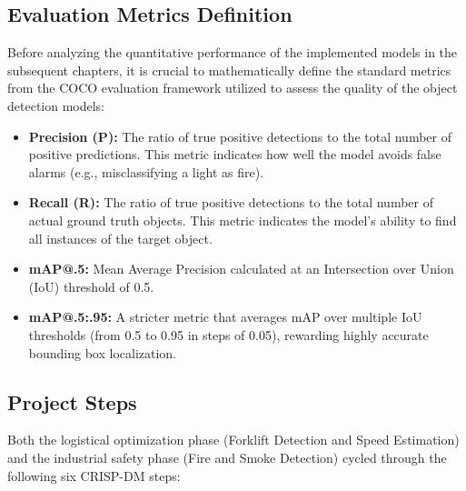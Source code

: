 \subsection{Evaluation Metrics Definition}
Before analyzing the quantitative performance of the implemented models in the subsequent chapters, it is crucial to mathematically define the standard metrics from the COCO evaluation framework utilized to assess the quality of the object detection models:
\begin{itemize}
    \item \textbf{Precision (P):} The ratio of true positive detections to the total number of positive predictions. This metric indicates how well the model avoids false alarms (e.g., misclassifying a light as fire).
    \item \textbf{Recall (R):} The ratio of true positive detections to the total number of actual ground truth objects. This metric indicates the model's ability to find all instances of the target object.
    \item \textbf{mAP@.5:} Mean Average Precision calculated at an Intersection over Union (IoU) threshold of 0.5.
    \item \textbf{mAP@.5:.95:} A stricter metric that averages mAP over multiple IoU thresholds (from 0.5 to 0.95 in steps of 0.05), rewarding highly accurate bounding box localization.
\end{itemize}

\subsection{Project Steps}
Both the logistical optimization phase (Forklift Detection and Speed Estimation) and the industrial safety phase (Fire and Smoke Detection) cycled through the following six CRISP-DM steps:

